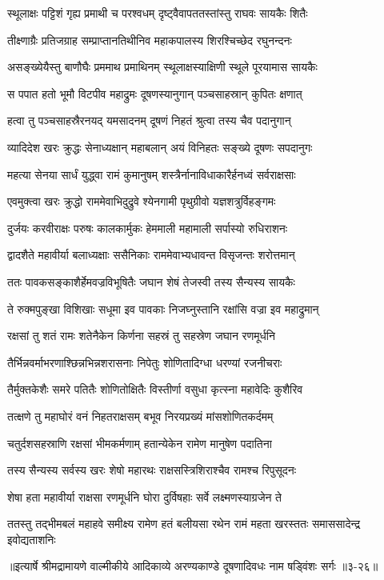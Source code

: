 \twolineshloka
{स्थूलाक्षः पट्टिशं गृह्य प्रमाथी च परश्वधम्}
{दृष्ट्वैवापततस्तांस्तु राघवः सायकैः शितैः} %

\twolineshloka
{तीक्ष्णाग्रैः प्रतिजग्राह सम्प्राप्तानतिथीनिव}
{महाकपालस्य शिरश्चिच्छेद रघुनन्दनः} %

\twolineshloka
{असङ्ख्येयैस्तु बाणौघैः प्रममाथ प्रमाथिनम्}
{स्थूलाक्षस्याक्षिणी स्थूले पूरयामास सायकैः} %

\twolineshloka
{स पपात हतो भूमौ विटपीव महाद्रुमः}
{दूषणस्यानुगान् पञ्चसाहस्रान् कुपितः क्षणात्} %

\twolineshloka
{हत्वा तु पञ्चसाहस्रैरनयद् यमसादनम्}
{दूषणं निहतं श्रुत्वा तस्य चैव पदानुगान्} %

\twolineshloka
{व्यादिदेश खरः क्रुद्धः सेनाध्यक्षान् महाबलान्}
{अयं विनिहतः सङ्ख्ये दूषणः सपदानुगः} %

\twolineshloka
{महत्या सेनया सार्धं युद्ध्वा रामं कुमानुषम्}
{शस्त्रैर्नानाविधाकारैर्हनध्वं सर्वराक्षसाः} %

\twolineshloka
{एवमुक्त्वा खरः क्रुद्धो राममेवाभिदुद्रुवे}
{श्येनगामी पृथुग्रीवो यज्ञशत्रुर्विहङ्गमः} %

\twolineshloka
{दुर्जयः करवीराक्षः परुषः कालकार्मुकः}
{हेममाली महामाली सर्पास्यो रुधिराशनः} %

\twolineshloka
{द्वादशैते महावीर्या बलाध्यक्षाः ससैनिकाः}
{राममेवाभ्यधावन्त विसृजन्तः शरोत्तमान्} %

\twolineshloka
{ततः पावकसङ्काशैर्हेमवज्रविभूषितैः}
{जघान शेषं तेजस्वी तस्य सैन्यस्य सायकैः} %

\twolineshloka
{ते रुक्मपुङ्खा विशिखाः सधूमा इव पावकाः}
{निजघ्नुस्तानि रक्षांसि वज्रा इव महाद्रुमान्} %

\twolineshloka
{रक्षसां तु शतं रामः शतेनैकेन किर्णना}
{सहस्रं तु सहस्रेण जघान रणमूर्धनि} %

\twolineshloka
{तैर्भिन्नवर्माभरणाश्छिन्नभिन्नशरासनाः}
{निपेतुः शोणितादिग्धा धरण्यां रजनीचराः} %

\twolineshloka
{तैर्मुक्तकेशैः समरे पतितैः शोणितोक्षितैः}
{विस्तीर्णा वसुधा कृत्स्ना महावेदिः कुशैरिव} %

\twolineshloka
{तत्क्षणे तु महाघोरं वनं निहतराक्षसम्}
{बभूव निरयप्रख्यं मांसशोणितकर्दमम्} %

\twolineshloka
{चतुर्दशसहस्राणि रक्षसां भीमकर्मणाम्}
{हतान्येकेन रामेण मानुषेण पदातिना} %

\twolineshloka
{तस्य सैन्यस्य सर्वस्य खरः शेषो महारथः}
{राक्षसस्त्रिशिराश्चैव रामश्च रिपुसूदनः} %

\twolineshloka
{शेषा हता महावीर्या राक्षसा रणमूर्धनि}
{घोरा दुर्विषहाः सर्वे लक्ष्मणस्याग्रजेन ते} %

\twolineshloka
{ततस्तु तद्भीमबलं महाहवे समीक्ष्य रामेण हतं बलीयसा}
{रथेन रामं महता खरस्ततः समाससादेन्द्र इवोद्यताशनिः} %


॥इत्यार्षे श्रीमद्रामायणे वाल्मीकीये आदिकाव्ये अरण्यकाण्डे दूषणादिवधः नाम षड्विंशः सर्गः ॥३-२६॥
